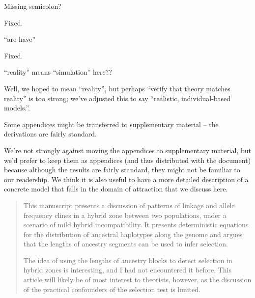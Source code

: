 \begin{point}{}
Missing semicolon?
\end{point}

\reply
Fixed.

\begin{point}{}
``are have''
\end{point}

\reply
Fixed.

\begin{point}{\revref}
``reality'' means ``simulation'' here??
\end{point}

\reply
Well, we hoped to mean ``reality'', but perhaps ``verify that theory matches reality'' is too strong; we've adjusted this to say ``realistic, individual-based models.''.

\begin{point}{}
 Some appendices might be transferred to supplementary material -- the derivations are fairly standard.
\end{point}

\reply
We're not strongly against moving the appendices to supplementary material,
but we'd prefer to keep them as appendices (and thus distributed with the document)
because although the results are fairly standard, 
they might not be familiar to our readership.  
We think it is also useful to have a more detailed description of a concrete model
that falls in the domain of attraction that we discuss here.




\begin{quote}
    This manuscript presents a discussion of patterns of linkage and allele frequency clines in a hybrid zone between two populations, under a scenario of mild hybrid incompatibility. It presents deterministic equations for the distribution of ancestral haplotypes along the genome and argues that the lengths of ancestry segments can be used to infer selection.

    The idea of using the lengths of ancestry blocks to detect selection in hybrid zones is interesting, and I had not encountered it before. This article will likely be of most interest to theorists, however, as the discussion of the practical confounders of the selection test is limited. 
\end{quote}

